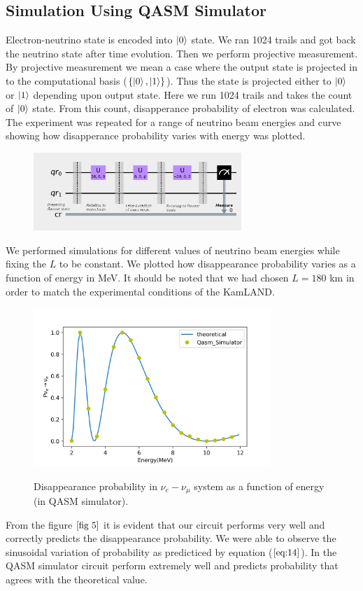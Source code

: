 \documentclass[12pt,a4paper]{report}
\begin{document}
\subsection{Simulation Using QASM Simulator}
Electron-neutrino state is encoded into $\ket{0}$ state. We ran 1024 trails and got back the neutrino state after time evolution. Then we perform projective measurement. By projective measurement we mean a case where the output state is projected in to the computational basis ($\{\ket{0},\ket{1}\}$). Thus the state is projected either to $\ket{0}$ or $\ket{1}$ depending upon output state. Here we run 1024 trails and takes the count of $\ket{0}$ state. From this count, disapperance probability of electron was calculated. The experiment was repeated for a range of neutrino beam energies and curve showing how disapperance probability varies with energy was plotted.\par
\begin{figure}[h]
	\graphicspath{ {./Images/} }
	\centering	
	{\includegraphics[width=0.7\textwidth]{fig_2.png}}
 \end{figure}\par
We performed simulations for different values of neutrino beam energies while fixing the $L$ to be constant. We plotted how disappearance probability varies as a function of energy in MeV. It should be noted that we had chosen $L=180$ km in order to match the experimental conditions of the KamLAND. 
\begin{figure}[H]
	\graphicspath{ {./Images/} }
	\centering	
	{\includegraphics[width=0.8\textwidth]{fig_5.png}}
	\caption{Disappearance probability in $\nu_{e}-\nu_{\mu}$ system as a function of energy (in QASM simulator). }
	\label{fig 5}
\end{figure}
From the figure $\ref{fig 5}$ it is evident that our circuit performs very well and correctly predicts the disappearance probability. We were able to observe the sinusoidal variation of probability as predicticed by equation ($\ref{eq:14}$). In the QASM simulator circuit perform extremely well and predicts probability that agrees with the theoretical value.
\end{document}
